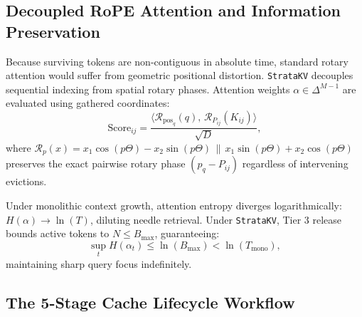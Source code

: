 \subsection{Decoupled RoPE Attention and Information Preservation}

Because surviving tokens are non-contiguous in absolute time, standard rotary attention would suffer from geometric positional distortion. \texttt{StrataKV} decouples sequential indexing from spatial rotary phases. Attention weights $\alpha \in \Delta^{M-1}$ are evaluated using gathered coordinates:
\begin{equation}
    \text{Score}_{ij} = \frac{\langle \mathcal{R}_{\text{pos}_q}(q), \, \mathcal{R}_{P_{ij}}(K_{ij}) \rangle}{\sqrt{D}},
\end{equation}
where $\mathcal{R}_p(x) = x_1 \cos(p \Theta) - x_2 \sin(p \Theta) \,\|\, x_1 \sin(p \Theta) + x_2 \cos(p \Theta)$ preserves the exact pairwise rotary phase $(p_q - P_{ij})$ regardless of intervening evictions.

\begin{theorem}
Under monolithic context growth, attention entropy diverges logarithmically: $H(\alpha) \to \ln(T)$, diluting needle retrieval. Under \texttt{StrataKV}, Tier 3 release bounds active tokens to $N \le B_{\text{max}}$, guaranteeing:
\begin{equation}
    \sup_t H(\alpha_t) \le \ln(B_{\text{max}}) < \ln(T_{\text{mono}}),
\end{equation}
maintaining sharp query focus indefinitely.
\end{theorem}

\subsection{The 5-Stage Cache Lifecycle Workflow}

